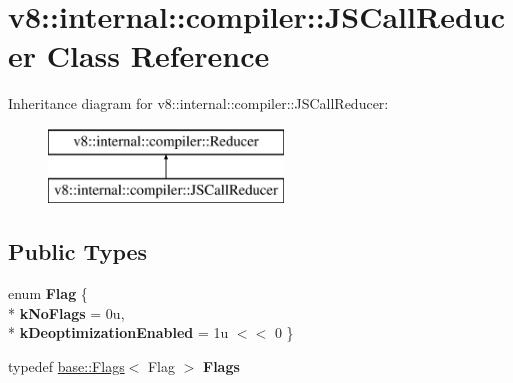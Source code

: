 \hypertarget{classv8_1_1internal_1_1compiler_1_1_j_s_call_reducer}{}\section{v8\+:\+:internal\+:\+:compiler\+:\+:J\+S\+Call\+Reducer Class Reference}
\label{classv8_1_1internal_1_1compiler_1_1_j_s_call_reducer}
Inheritance diagram for v8\+:\+:internal\+:\+:compiler\+:\+:J\+S\+Call\+Reducer\+:\begin{figure}[H]
\begin{center}
\leavevmode
\includegraphics[height=2.000000cm]{classv8_1_1internal_1_1compiler_1_1_j_s_call_reducer}
\end{center}
\end{figure}
\subsection*{Public Types}
\begin{DoxyCompactItemize}
\item 
enum {\bfseries Flag} \{ \\*
{\bfseries k\+No\+Flags} = 0u, 
\\*
{\bfseries k\+Deoptimization\+Enabled} = 1u $<$$<$ 0
 \}\hypertarget{classv8_1_1internal_1_1compiler_1_1_j_s_call_reducer_a6996f7826b08cb7b4ef61f9bd5874a9c}{}\label{classv8_1_1internal_1_1compiler_1_1_j_s_call_reducer_a6996f7826b08cb7b4ef61f9bd5874a9c}

\item 
typedef \hyperlink{classv8_1_1base_1_1_flags}{base\+::\+Flags}$<$ Flag $>$ {\bfseries Flags}\hypertarget{classv8_1_1internal_1_1compiler_1_1_j_s_call_reducer_a920d8d4abde8cc564a01f8c7580a39d8}{}\label{classv8_1_1internal_1_1compiler_1_1_j_s_call_reducer_a920d8d4abde8cc564a01f8c7580a39d8}

\end{DoxyCompactItemize}
